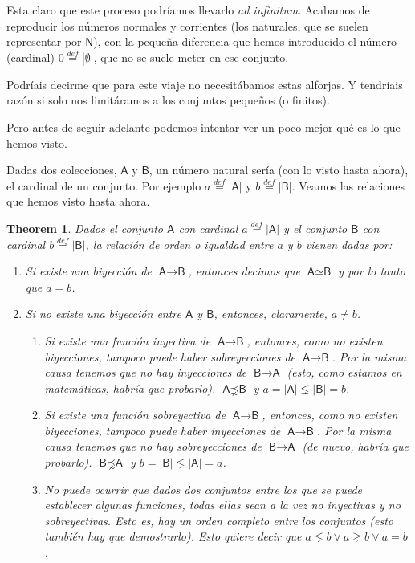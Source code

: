\documentclass{amsart}
\newtheorem{thm}{Theorem}[section]
\theoremstyle{definition}
\theoremstyle{remark}
\numberwithin{equation}{section}
\newcommand{\abs}[1]{\left\lvert#1\right\rvert}
\newcommand{\fromto}{\longrightarrow}
\newcommand{\setsymbol}[1]{\textsf{#1}}
\newcommand{\sA}{\setsymbol{A}}
\newcommand{\sB}{\setsymbol{B}}
\newcommand{\sN}{\setsymbol{N}}
\newcommand{\card}[1]{\abs{#1}}
\newcommand{\defin}{\overset {def}{=}}
\begin{document}
	Esta claro que este proceso podríamos llevarlo \emph{ad infinitum}. 
Acabamos de reproducir los números normales y corrientes (los naturales, que 
se suelen representar por $\sN$), con la pequeña diferencia que hemos 
introducido el número (cardinal) $0 \defin \card{\emptyset}$, que no se suele 
meter en ese conjunto.


	Podríais decirme que para este viaje no necesitábamos estas alforjas. Y 
tendríais razón si solo nos limitáramos a los conjuntos pequeños (o finitos).


	Pero antes de seguir adelante podemos intentar ver un poco mejor qué es 
lo que hemos visto.


	Dadas dos colecciones, $\sA$ y $\sB$, un número natural sería (con lo 
visto hasta ahora), el cardinal de un conjunto. Por ejemplo $a \defin 
\card{\sA}$ y $b \defin \card{\sB}$. Veamos las relaciones que hemos visto 
hasta ahora.

\begin{thm}
  Dados el conjunto $\sA$ con cardinal $a \defin \card{\sA}$ y el conjunto 
  $\sB$ con cardinal $b \defin \card{\sB}$, la relación de orden o igualdad 
  entre $a$ y $b$ vienen dadas por:
  \begin{enumerate}
  	\item Si existe una biyección de $\sA \fromto \sB$, entonces decimos 
  que $\sA \simeq \sB$ y por lo tanto que $a = b$.
    \item Si no existe una biyección entre $\sA$ y $\sB$, entonces, 
    claramente, $a\neq b$.
        \begin{enumerate}
        \item Si existe una función inyectiva de $\sA \fromto \sB$, 
        entonces, como no existen biyecciones, tampoco puede haber 
        sobreyecciones de $\sA \fromto \sB$. Por la misma causa tenemos 
        que no hay inyecciones de $\sB \fromto \sA$ (esto, como estamos 
        en matemáticas, habría que probarlo). $\sA \precnsim \sB$ y $a = 
        \card{\sA}\lneq \card{\sB} = b$.
        \item Si existe una función sobreyectiva de $\sA \fromto \sB$, 
        entonces, como no existen biyecciones, tampoco puede haber 
        inyecciones de $\sA \fromto \sB$. Por la misma causa tenemos que 
        no hay sobreyecciones de $\sB \fromto \sA$ (de nuevo, habría que 
        probarlo). $\sB \precnsim \sA$ y $b = \card{\sB}\lneq \card{\sA} 
        = a$.
        \item No puede ocurrir que dados dos conjuntos entre los que se 
        puede establecer algunas funciones, todas ellas sean a la vez no 
        inyectivas y no sobreyectivas. Esto es, hay un orden completo 
        entre los conjuntos (esto también hay que demostrarlo). Esto 
        quiere decir que $a \lneq b \vee a \gneq b \vee a = b$.
       \end{enumerate}
  \end{enumerate}
\end{thm}
\end{document}
